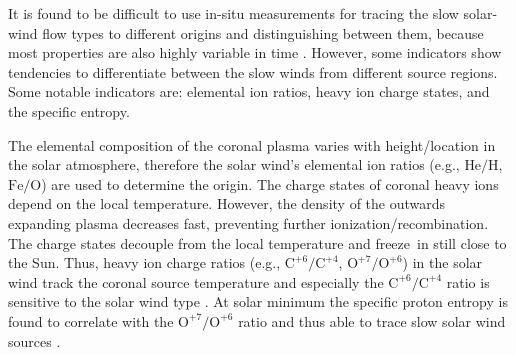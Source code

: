 It is found to be difficult to use in-situ measurements for tracing the slow solar-wind flow types to different origins and distinguishing between them, because most properties are also highly variable in time \citep{Kilpua2016}. However, some indicators show tendencies to differentiate between the slow winds from different source regions. Some notable indicators are: elemental ion ratios, heavy ion charge states, and the specific entropy.

The elemental composition of the coronal plasma varies with height/location in the solar atmosphere, therefore the solar wind's elemental ion ratios (e.g., $\text{He}/\text{H}$, $\text{Fe}/\text{O}$) are used to determine the origin.
The charge states of coronal heavy ions depend on the local temperature. However, the density of the outwards expanding plasma decreases fast, preventing further ionization/recombination. The charge states decouple from the local temperature and freeze~in still close to the Sun. Thus, heavy ion charge ratios (e.g., $\text{C}^{+6}\!/\text{C}^{+4}$, $\text{O}^{+7}\!/\text{O}^{+6}$) in the solar wind track the coronal source temperature and especially the $\text{C}^{+6}\!/\text{C}^{+4}$ ratio is sensitive to the solar wind type \citep{Landi2012}.
At solar minimum the specific proton entropy is found to correlate with the $\text{O}^{+7}\!/\text{O}^{+6}$ ratio and thus able to trace slow solar wind sources \citep{Pagel2004}.

